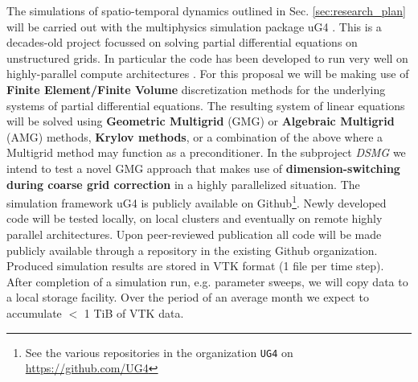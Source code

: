 \label{sec:Project-Details}
The simulations of spatio-temporal dynamics outlined in Sec. \ref{sec:research_plan} will be carried out with the multiphysics simulation package uG4 \citep{Vogel2013, Heppner13}. This is a decades-old project focussed on solving partial differential equations on unstructured grids. In particular the code has been developed to run very well on highly-parallel compute architectures \citep{Vogel2013, Heppner13}. For this proposal we will be making use of \textbf{Finite Element/Finite Volume} discretization methods for the underlying systems of partial differential equations. The resulting system of linear equations will be solved using \textbf{Geometric Multigrid} (GMG) or \textbf{Algebraic Multigrid} (AMG) methods, \textbf{Krylov methods}, or a combination of the above where a Multigrid method may function as a preconditioner. In the subproject \emph{DSMG} we intend to test a novel GMG approach that makes use of \textbf{dimension-switching during coarse grid correction} in a highly parallelized situation. 
The simulation framework uG4 is publicly available on Github\footnote{See the various repositories in the organization \texttt{UG4} on \url{https://github.com/UG4}}. Newly developed code will be tested locally, on local clusters and eventually on remote highly parallel architectures. Upon peer-reviewed publication all code will be made publicly available through a repository in the existing Github organization.
Produced simulation results are stored in VTK format (1 file per time step). After completion of a simulation run, e.g. parameter sweeps, we will copy data to a local storage facility. Over the period of an average month we expect to accumulate $<$ 1 TiB of VTK data. 
